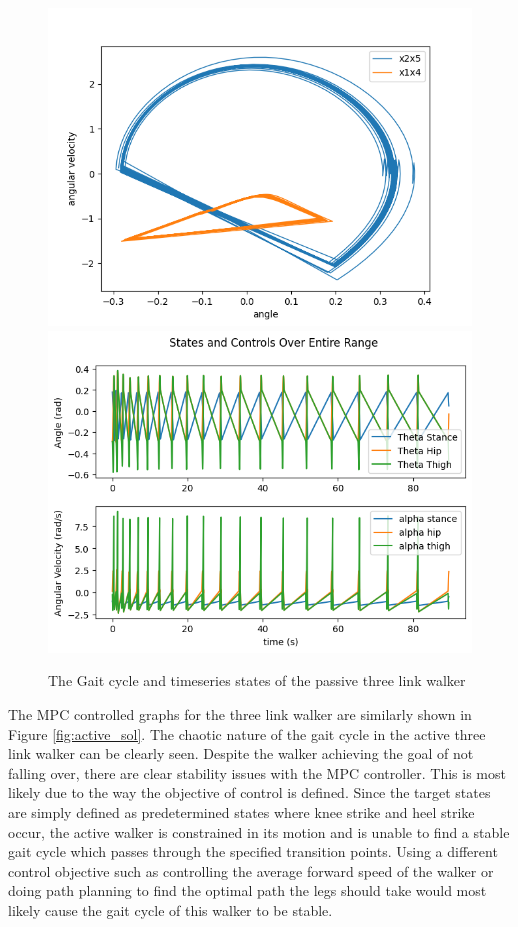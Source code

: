 \documentclass{./springer/svjour3}
\begin{document}
\begin{figure}[!h]
  \centering
  \includegraphics[width=.4\linewidth]{./figures/gait_passive.png} %
  \includegraphics[width=.4\linewidth]{./figures/ts_passive.png}
  \caption{The Gait cycle and timeseries states of the passive three link walker}
  \label{fig:passive_sol}
  \end{figure}

The MPC controlled graphs for the three link walker are similarly shown in Figure \ref{fig:active_sol}. The chaotic nature of the gait cycle in the active three link walker 
can be clearly seen. Despite the walker achieving the goal of not falling over, there are clear stability issues with the MPC controller. This is most likely due 
to the way the objective of control is defined. Since the target states are simply defined as predetermined states where knee strike and heel strike occur, the 
active walker is constrained in its motion and is unable to find a stable gait cycle which passes through the specified transition points. 
Using a different control objective such as controlling the average forward speed of the walker or doing path planning to find the optimal path the legs should take 
would most likely cause the gait cycle of this walker to be stable.
\end{document}
